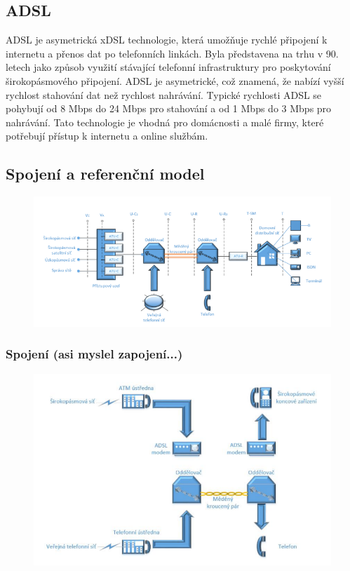 \subsection{ADSL}
ADSL je asymetrická xDSL technologie, která umožňuje rychlé připojení k internetu a přenos dat po telefonních linkách. Byla představena na trhu v 90. letech jako způsob využití stávající telefonní infrastruktury pro poskytování širokopásmového připojení. ADSL je asymetrické, což znamená, že nabízí vyšší rychlost stahování dat než rychlost nahrávání. Typické rychlosti ADSL se pohybují od 8 Mbps do 24 Mbps pro stahování a od 1 Mbps do 3 Mbps pro nahrávání. Tato technologie je vhodná pro domácnosti a malé firmy, které potřebují přístup k internetu a online službám.

\subsection{Spojení a referenční model}
\begin{figure} [h]
    \centering
    \includegraphics[scale=0.85]{snimky/ADSL model.png}
\end{figure}
\newpage
\subsubsection{Spojení (asi myslel zapojení...)}
\begin{figure} [h]
    \centering
    \includegraphics[scale=0.8]{snimky/zapoj.png}
\end{figure}

